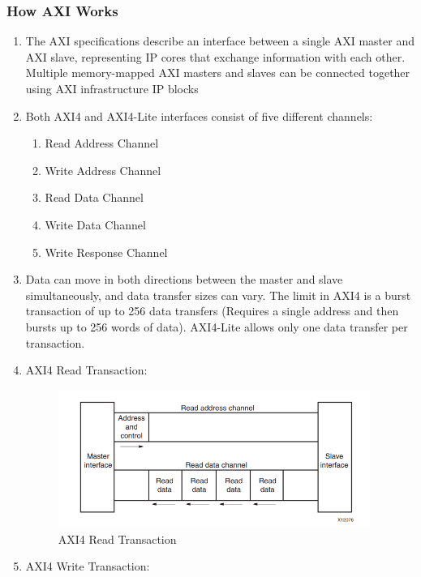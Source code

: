 \subsubsection{How AXI Works}
\begin{enumerate}
    \item The AXI specifications describe an interface between a single AXI master and AXI slave, representing IP cores that exchange information with each other. Multiple memory-mapped AXI masters and slaves can be connected together using AXI infrastructure IP blocks
    \item Both AXI4 and AXI4-Lite interfaces consist of five different channels: 
    \begin{enumerate}
        \item Read Address Channel
        \item Write Address Channel
        \item Read Data Channel
        \item Write Data Channel
        \item Write Response Channel
    \end{enumerate}
    \item Data can move in both directions between the master and slave simultaneously, and data transfer sizes can vary. The limit in AXI4 is a burst transaction of up to 256 data transfers (Requires a single address and then bursts up to 256 words of data). AXI4-Lite allows only one data transfer per transaction.
    \item AXI4 Read Transaction:
        \begin{figure}[H]
        \begin{center}
        \includegraphics[width=4in]{images/AXIREAD.png}
        \caption{AXI4 Read Transaction}
        \label{AXIREAD}
        \end{center}
        \end{figure} 
    \item AXI4 Write Transaction:
        \begin{figure}[H]
        \begin{center}

\end{center}
\end{figure}
\end{enumerate}
